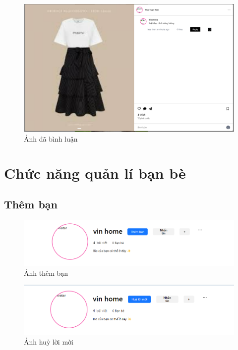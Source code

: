 \FloatBarrier %

\begin{figure}[H]
    \centering
    \includegraphics[width=1\textwidth]{img/instagram/da_binh_luan.png}
    \caption{Ảnh đã bình luận}
\end{figure}

\FloatBarrier %

\section{Chức năng quản lí bạn bè}
\subsection{Thêm bạn}
\begin{figure}[H]
    \centering
    \includegraphics[width=1\textwidth]{img/instagram/them_ban.png}
    \caption{Ảnh thêm bạn}
\end{figure}

\FloatBarrier %
\begin{figure}[H]
    \centering
    \includegraphics[width=1\textwidth]{img/instagram/huy_loi_moi.png}
    \caption{Ảnh huỷ lời mời}
\end{figure}


